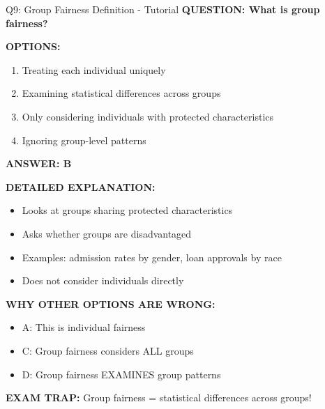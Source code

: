 \documentclass[8pt]{beamer}
\begin{document}
	\begin{frame}{Q9: Group Fairness Definition - Tutorial}
		\fontsize{6.5}{7.5}\selectfont
		\textbf{QUESTION: What is group fairness?}
		
		\vspace{0.1cm}
		\textbf{OPTIONS:}
		\begin{enumerate}
			\item Treating each individual uniquely
			\item Examining statistical differences across groups
			\item Only considering individuals with protected characteristics
			\item Ignoring group-level patterns
		\end{enumerate}
		
		\vspace{0.1cm}
		\textcolor{myblue}{\textbf{ANSWER: B}}
		
		\vspace{0.1cm}
		\textbf{DETAILED EXPLANATION:}
		\begin{itemize}
			\item Looks at groups sharing protected characteristics
			\item Asks whether groups are disadvantaged
			\item Examples: admission rates by gender, loan approvals by race
			\item Does not consider individuals directly
		\end{itemize}
		
		\vspace{0.1cm}
		\textcolor{myred}{\textbf{WHY OTHER OPTIONS ARE WRONG:}}
		\begin{itemize}
			\item \textcolor{myred}{A:} This is individual fairness
			\item \textcolor{myred}{C:} Group fairness considers ALL groups
			\item \textcolor{myred}{D:} Group fairness EXAMINES group patterns
		\end{itemize}
		
		\textcolor{myred}{\textbf{EXAM TRAP:}} Group fairness = \textcolor{myblue}{statistical differences across groups}!
	\end{frame}
	
\end{document}
